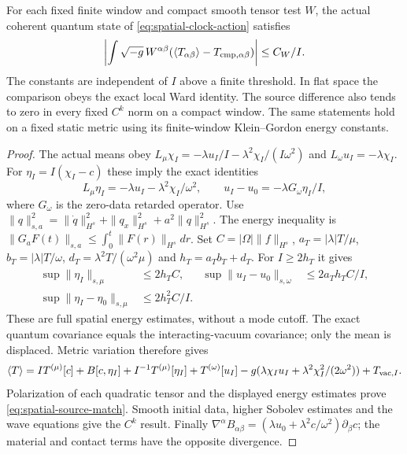 \begin{proposition}
\label{prop:spatial-clock-matching}
For each fixed finite window and compact smooth tensor test $W$,
the actual coherent quantum state of \eqref{eq:spatial-clock-action}
satisfies
\begin{equation}
 \left|\int\sqrt{-g}\,W^{\alpha\beta}
       (\langle T_{\alpha\beta}\rangle-T_{{\rm cmp},\alpha\beta})\right|
       \le C_W/I.
 \label{eq:spatial-source-match}
\end{equation}
The constants are independent of $I$ above a finite threshold. In flat
space the comparison obeys the exact local Ward identity. The
source difference also tends to zero in every fixed $C^k$ norm on a
compact window. The same statements hold on a fixed static metric
using its finite-window Klein--Gordon energy constants.
\end{proposition}
\begin{proof}
The actual means obey
$L_\mu\chi_I=-\lambda u_I/I-\lambda^2\chi_I/(I\omega^2)$ and
$L_\omega u_I=-\lambda\chi_I$. For
$\eta_I=I(\chi_I-c)$ these imply the exact identities
\[
 L_\mu\eta_I=-\lambda u_I-\lambda^2\chi_I/\omega^2,
 \qquad u_I-u_0=-\lambda G_\omega\eta_I/I,
\]
where $G_\omega$ is the zero-data retarded operator. Use
$\|q\|_{s,a}^2=\|\dot q\|_{H^s}^2+\|q_x\|_{H^s}^2+a^2\|q\|_{H^s}^2$.
The energy inequality is
$\|G_a F(t)\|_{s,a}\le\int_0^t\|F(r)\|_{H^s}dr$.
Set $C=|\Omega|\|f\|_{H^s}$,
$a_T=|\lambda|T/\mu$, $b_T=|\lambda|T/\omega$,
$d_T=\lambda^2T/(\omega^2\mu)$ and $h_T=a_Tb_T+d_T$.
For $I\ge2h_T$ it gives
\begin{align}
 \sup\|\eta_I\|_{s,\mu}&\le2h_TC,&
 \sup\|u_I-u_0\|_{s,\omega}&\le2a_Th_TC/I,\\
 \sup\|\eta_I-\eta_0\|_{s,\mu}&\le2h_T^2C/I.
\end{align}
These are full spatial energy estimates, without a mode cutoff.
The exact quantum covariance equals the interacting-vacuum covariance;
only the mean is displaced. Metric variation therefore gives
\[
 \langle T\rangle=I T^{(\mu)}[c]+B[c,\eta_I]
   +I^{-1}T^{(\mu)}[\eta_I]+T^{(\omega)}[u_I]
   -g(\lambda\chi_Iu_I+\lambda^2\chi_I^2/(2\omega^2))+T_{{\rm vac},I}.
\]
Polarization of each quadratic tensor and the displayed energy
estimates prove \eqref{eq:spatial-source-match}. Smooth initial data,
higher Sobolev estimates and the wave equations give the $C^k$ result.
Finally
$\nabla^\alpha B_{\alpha\beta}
 =(\lambda u_0+\lambda^2c/\omega^2)\partial_\beta c$;
the material and contact terms have the opposite divergence.
\end{proof}

